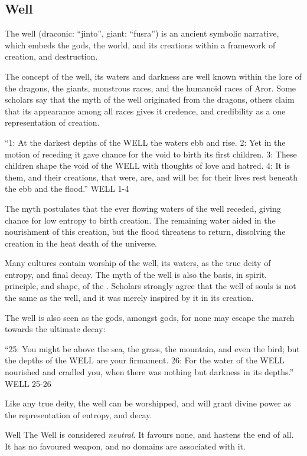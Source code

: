 \subsection{Well}
\label{sec:Well}

The well (draconic: ``jinto'', giant: ``fusra'') is an ancient symbolic
narrative, which embeds the gods, the world, and its creations within a
framework of creation, and destruction.

The concept of the well, its waters and darkness are well known within the lore
of the dragons, the giants, monstrous races, and the humanoid races of Aror.
Some scholars say that the myth of the well originated from the dragons, others
claim that its appearance among all races gives it credence, and credibility
as a one representation of creation.

\begin{displayquote}
  ``1: At the darkest depths of the WELL the waters ebb and rise. 2: Yet in the
  motion of receding it gave chance for the void to birth its first children. 3:
  These children shape the void of the WELL with thoughts of love and hatred. 4:
  It is them, and their creations, that were, are, and will be; for their lives
  rest beneath the ebb and the flood.'' WELL 1-4
\end{displayquote}

The myth postulates that the ever flowing waters of the well receded, giving
chance for low entropy to birth creation. The remaining water aided in the
nourishment of this creation, but the flood threatens to return, dissolving
the creation in the heat death of the universe.

Many cultures contain worship of the well, its waters, as the true deity of
entropy, and final decay. The myth of the well is also the basis, in spirit,
principle, and shape, of the . Scholars strongly
agree that the well of souls is not the same as the well, and it was merely
inspired by it in its creation.

The well is also seen as the gods, amongst gods, for none may escape the march
towards the ultimate decay:

\begin{displayquote}
  ``25: You might be above the sea, the grass, the mountain, and even the bird;
  but the depths of the WELL are your firmament. 26: For the water of the WELL
  nourished and cradled you, when there was nothing but darkness in its
  depths.'' WELL 25-26
\end{displayquote}

Like any true deity, the well can be worshipped, and will grant divine power as
the representation of entropy, and decay.

\begin{35e}{Well}
  The Well is considered \emph{neutral}. It favours none, and hastens the end of
  all. It has no favoured weapon, and no domains are associated with it.
\end{35e}
